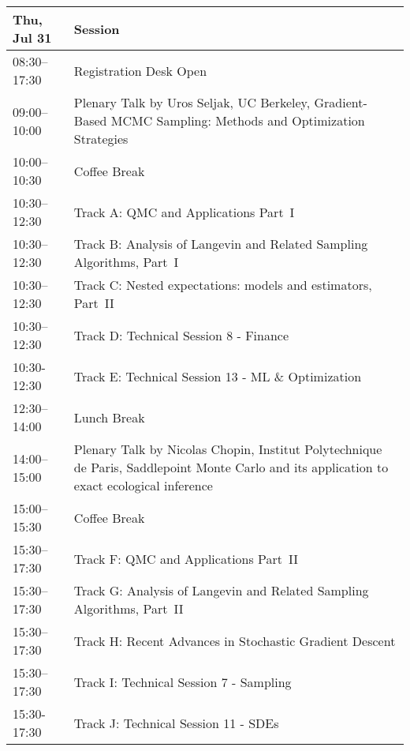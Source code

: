 \begin{table}
\begin{tabularx}{\textwidth}{>{\hsize=0.32\hsize}X|>{\hsize=1.7\hsize}X}
\hline
\textbf{Thu, Jul 31} & \textbf{Session} \\
\hline
\cellcolor{\EmptyColor}08:30–17:30 & \cellcolor{\EmptyColor}Registration Desk Open \\
\cellcolor{\PlenaryColor}09:00–10:00 & \cellcolor{\PlenaryColor}Plenary Talk by Uros Seljak, UC Berkeley, Gradient-Based MCMC Sampling: Methods and Optimization Strategies \\
\cellcolor{\EmptyColor}10:00–10:30 & \cellcolor{\EmptyColor}Coffee Break \\
\cellcolor{\SessionTitleColor}10:30–12:30 & \cellcolor{\SessionTitleColor}Track A: QMC and Applications Part~I \\
\cellcolor{\SessionTitleColor}10:30–12:30 & \cellcolor{\SessionTitleColor}Track B: Analysis of Langevin and Related Sampling Algorithms, Part~I \\
\cellcolor{\SessionTitleColor}10:30–12:30 & \cellcolor{\SessionTitleColor}Track C: Nested expectations: models and estimators, Part~II \\
\cellcolor{\SessionLightColor}10:30–12:30 & \cellcolor{\SessionLightColor}Track D: Technical Session 8 - Finance \\
\cellcolor{\SessionLightColor}10:30-12:30 & \cellcolor{\SessionLightColor}Track E: Technical Session 13 - ML \& Optimization \\
\cellcolor{\EmptyColor}12:30–14:00 & \cellcolor{\EmptyColor}Lunch Break \\
\cellcolor{\PlenaryColor}14:00–15:00 & \cellcolor{\PlenaryColor}Plenary Talk by Nicolas Chopin, Institut Polytechnique de Paris, Saddlepoint Monte Carlo and its application to exact ecological inference \\
\cellcolor{\EmptyColor}15:00–15:30 & \cellcolor{\EmptyColor}Coffee Break \\
\cellcolor{\SessionTitleColor}15:30–17:30 & \cellcolor{\SessionTitleColor}Track F: QMC and Applications Part~II \\
\cellcolor{\SessionTitleColor}15:30–17:30 & \cellcolor{\SessionTitleColor}Track G: Analysis of Langevin and Related Sampling Algorithms, Part~II \\
\cellcolor{\SessionTitleColor}15:30–17:30 & \cellcolor{\SessionTitleColor}Track H: Recent Advances in Stochastic Gradient Descent \\
\cellcolor{\SessionLightColor}15:30–17:30 & \cellcolor{\SessionLightColor}Track I: Technical Session 7 - Sampling \\
\cellcolor{\SessionLightColor}15:30-17:30 & \cellcolor{\SessionLightColor}Track J: Technical Session 11 - SDEs \\
\hline
\end{tabularx}
\end{table}

